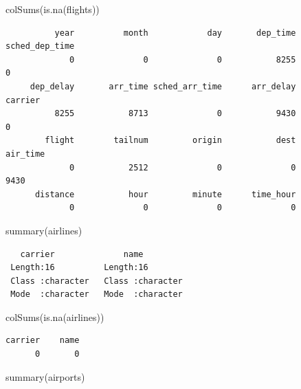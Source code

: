 \documentclass[
  10pt,
  letterpaper,
  DIV=11,
  numbers=noendperiod]{scrartcl}
\newenvironment{Shaded}{\begin{snugshade}}{\end{snugshade}}
\newcommand{\FunctionTok}[1]{\textcolor[rgb]{0.28,0.35,0.67}{#1}}
\newcommand{\NormalTok}[1]{\textcolor[rgb]{0.00,0.23,0.31}{#1}}
\begin{document}
\begin{Shaded}
\begin{Highlighting}[numbers=left,,]
\FunctionTok{colSums}\NormalTok{(}\FunctionTok{is.na}\NormalTok{(flights))}
\end{Highlighting}
\end{Shaded}

\begin{verbatim}
          year          month            day       dep_time sched_dep_time 
             0              0              0           8255              0 
     dep_delay       arr_time sched_arr_time      arr_delay        carrier 
          8255           8713              0           9430              0 
        flight        tailnum         origin           dest       air_time 
             0           2512              0              0           9430 
      distance           hour         minute      time_hour 
             0              0              0              0 
\end{verbatim}

\begin{Shaded}
\begin{Highlighting}[numbers=left,,]
\FunctionTok{summary}\NormalTok{(airlines)}
\end{Highlighting}
\end{Shaded}

\begin{verbatim}
   carrier              name          
 Length:16          Length:16         
 Class :character   Class :character  
 Mode  :character   Mode  :character  
\end{verbatim}

\begin{Shaded}
\begin{Highlighting}[numbers=left,,]
\FunctionTok{colSums}\NormalTok{(}\FunctionTok{is.na}\NormalTok{(airlines))}
\end{Highlighting}
\end{Shaded}

\begin{verbatim}
carrier    name 
      0       0 
\end{verbatim}

\begin{Shaded}
\begin{Highlighting}[numbers=left,,]
\FunctionTok{summary}\NormalTok{(airports)}
\end{Highlighting}
\end{Shaded}
\end{document}
